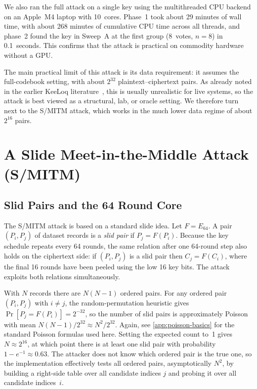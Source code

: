 \documentclass[version=preprint]{iacrcc}
\begin{document}
We also ran the full attack on a single key using the multithreaded CPU backend on an Apple~M4 laptop with 10~cores.
Phase~1 took about 29 minutes of wall time, with about 268 minutes of cumulative CPU time across all threads, and phase~2 found the key in Sweep~A at the first group (8~votes, $n=8$) in 0.1~seconds.
This confirms that the attack is practical on commodity hardware without a GPU.

The main practical limit of this attack is its data requirement: it assumes the full-codebook setting, with about $2^{32}$ plaintext--ciphertext pairs.
As already noted in the earlier KeeLoq literature~\cite{bogdanov2007linear,courtois2007algebraic}, this is usually unrealistic for live systems, so the attack is best viewed as a structural, lab, or oracle setting.
We therefore turn next to the S/MITM attack, which works in the much lower data regime of about $2^{16}$ pairs.

\section{A Slide Meet-in-the-Middle Attack (S/MITM)}\label{sec:mitm}

\subsection{Slid Pairs and the 64 Round Core}\label{sec:slid-pairs}

The S/MITM attack is based on a standard slide idea.
Let $F = E_{64}$.
A pair $(P_i,P_j)$ of dataset records is a \emph{slid pair} if $P_j = F(P_i)$.
Because the key schedule repeats every 64 rounds, the same relation after one 64-round step also holds on the ciphertext side:
if $(P_i,P_j)$ is a slid pair then $C_j = F(C_i)$, where the final 16 rounds have been peeled using the low 16 key bits.
The attack exploits both relations simultaneously.

With $N$ records there are $N(N-1)$ ordered pairs.
For any ordered pair $(P_i,P_j)$ with $i \neq j$, the random-permutation heuristic gives $\Pr[P_j = F(P_i)] = 2^{-32}$, so the number of slid pairs is approximately Poisson with mean $N(N-1)/2^{32} \approx N^2/2^{32}$.
Again, see \autoref{app:poisson-basics} for the standard Poisson formulas used here.
Setting the expected count to~1 gives $N \approx 2^{16}$, at which point there is at least one slid pair with probability $1 - e^{-1} \approx 0.63$.
The attacker does not know which ordered pair is the true one, so the implementation effectively tests all ordered pairs, asymptotically $N^2$, by building a right-side table over all candidate indices $j$ and probing it over all candidate indices~$i$.
\end{document}
